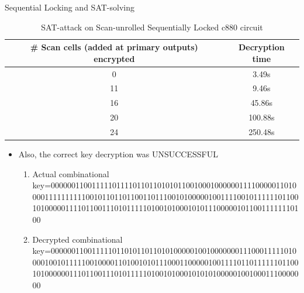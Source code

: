 
\begin{frame}{Sequential Locking and SAT-solving}
	\begin{table}[!htbp]
		\begin{center}
			\caption{SAT-attack on Scan-unrolled Sequentially Locked c880 circuit}
			\label{tab:sat-attack}
			\begin{tabular}{|c|c|}
				\hline
				\# Scan cells (added at primary outputs) encrypted & Decryption time \\
				\hline
				0 & 3.49s \\
				\hline
				11 & 9.46s \\
				\hline
				16 & 45.86s \\
				\hline
				20 & 100.88s \\
				\hline
				24 & 250.48s \\
				\hline
			\end{tabular}
		\end{center}
	\end{table}
	\begin{itemize}
		\item Also, the correct key decryption was \alert{UNSUCCESSFUL} 
			\begin{enumerate}
			\item Actual combinational key=000000110011111011110110110101011001000100000011110000011010000111111111100101101101100110111001010000010011110010111111011001010000011110110011101011111010010100010101110000010110011111110100
			\item Decrypted combinational key=000000110011111011010110110101000001001000000011100011111010000100101111100100001101001010111000110000010011110110111111011001010000001110110011101011111010010100010101010000010010001110000000
			\end{enumerate}
	\end{itemize}
\end{frame}

